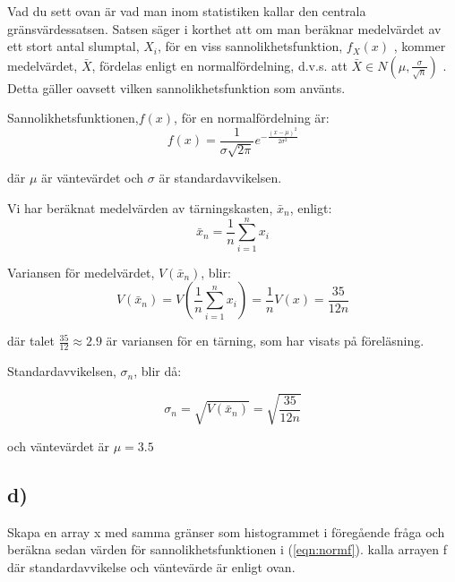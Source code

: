 \documentclass[a4paper]{article}
\begin{document}
Vad du sett ovan är vad man inom statistiken kallar den centrala gränsvärdessatsen.
Satsen säger i korthet att om man beräknar medelvärdet av ett stort antal slumptal,
\( X_i \), för en viss sannolikhetsfunktion, \(f_X(x)\) , kommer medelvärdet, \(\bar{X}\),
fördelas enligt en normalfördelning, d.v.s. att \(\bar{X} \in N(\mu,\frac{\sigma}{\sqrt{n}})\) . Detta gäller oavsett
vilken sannolikhetsfunktion som använts.


Sannolikhetsfunktionen,\(f(x)\), för en normalfördelning är:
\begin{equation} \label{eqn:normf}
    f(x)=\frac{1}{\sigma\sqrt{2\pi}}e^{-\frac{(x-\mu)^2}{2\sigma^2}}
\end{equation}

där \( \mu \) är väntevärdet och \( \sigma \) är standardavvikelsen.

Vi har beräknat medelvärden av tärningskasten, \( \bar{x}_n \), enligt:
\begin{equation} \label{eqn:tarning_medel}
    \bar{x}_n = \frac{1}{n}\sum_{i=1}^n x_i
\end{equation}

Variansen för medelvärdet, \( V(\bar{x}_n) \), blir:
\begin{equation} \label{eqn:varians}
    V(\bar{x}_n)=V\left(\frac{1}{n}\sum_{i=1}^nx_i\right)= \frac{1}{n}V(x)=\frac{35}{12n}
\end{equation}

där talet \( \frac{35}{12}\approx 2.9 \) är variansen för en tärning, som har visats på föreläsning.

Standardavvikelsen, \( \sigma_n\), blir då:

\begin{equation} \label{eqn:stdev}
    \sigma_n=\sqrt{V(\bar{x}_n)}=\sqrt{\frac{35}{12n}}
\end{equation}

och väntevärdet är \( \mu=3.5 \)


\subsection{d)}

Skapa en array x med samma gränser som histogrammet i föregående fråga
och beräkna sedan värden för sannolikhetsfunktionen i (\ref{eqn:normf}).
kalla arrayen f där standardavvikelse och väntevärde är enligt ovan.
\end{document}
